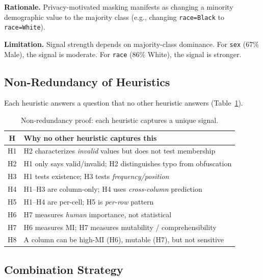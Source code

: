 \documentclass[11pt,a4paper]{article}
\begin{document}
\textbf{Rationale.}
Privacy-motivated masking manifests as changing a minority demographic value
to the majority class (e.g., changing \texttt{race=Black} to
\texttt{race=White}).

\textbf{Limitation.}
Signal strength depends on majority-class dominance.  For \texttt{sex} (67\%
Male), the signal is moderate.  For \texttt{race} (86\% White), the signal is
stronger.

\subsection{Non-Redundancy of Heuristics}

Each heuristic answers a question that no other heuristic answers
(Table~\ref{tab:non-redundancy}).

\begin{table}[h]
\centering
\caption{Non-redundancy proof: each heuristic captures a unique signal.}
\label{tab:non-redundancy}
\small
\begin{tabular}{@{}cl@{}}
\toprule
\textbf{H} & \textbf{Why no other heuristic captures this} \\
\midrule
H1 & H2 characterizes \emph{invalid} values but does not test membership \\
H2 & H1 only says valid/invalid; H2 distinguishes typo from obfuscation \\
H3 & H1 tests existence; H3 tests \emph{frequency/position} \\
H4 & H1--H3 are column-only; H4 uses \emph{cross-column} prediction \\
H5 & H1--H4 are per-cell; H5 is \emph{per-row} pattern \\
H6 & H7 measures \emph{human} importance, not statistical \\
H7 & H6 measures MI; H7 measures mutability / comprehensibility \\
H8 & A column can be high-MI (H6), mutable (H7), but not sensitive \\
\bottomrule
\end{tabular}
\end{table}

\subsection{Combination Strategy}
\end{document}
